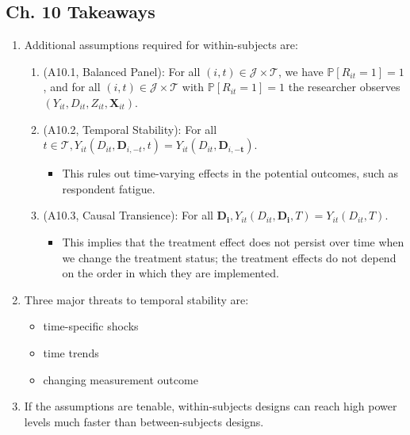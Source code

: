 \documentclass[10pt]{article}
\begin{document}
\subsection{Ch. 10 Takeaways}

\begin{enumerate}
    \item Additional assumptions required for within-subjects are:
        \begin{enumerate}
            \item (A10.1, Balanced Panel): For all $(i, t) \in \mathcal{J} \times \mathcal{T}$, we have $\mathbb{P}\left[R_{i t}=1\right]=1$, and for all $(i, t) \in \mathcal{J} \times \mathcal{T}$ with $\mathbb{P}\left[R_{i t}=1\right]=1$ the researcher observes $\left(Y_{i t}, D_{i t}, Z_{i t}, \boldsymbol{X}_{i t}\right)$.
            \item (A10.2, Temporal Stability): For all $t \in \mathcal{T}, Y_{i t}\left(D_{i t}, \boldsymbol{D}_{i,-t}, t\right)=Y_{i t}\left(D_{i t}, \boldsymbol{D}_{i,-\boldsymbol{t}}\right)$.
                \begin{itemize}
                    \item This rules out time-varying effects in the potential outcomes, 
                        such as respondent fatigue.
                \end{itemize}
            \item (A10.3, Causal Transience): For all $\boldsymbol{D}_{\boldsymbol{i}}, Y_{i t}\left(D_{i t}, \boldsymbol{D}_{\boldsymbol{i}}, T\right)=Y_{i t}\left(D_{i t}, T\right)$.
                \begin{itemize}
                    \item This implies that the treatment effect does not persist over time 
                        when we change the treatment status; the treatment effects 
                        do not depend on the order in which they are implemented.
                \end{itemize}
        \end{enumerate} 
    \item Three major threats to temporal stability are:
        \begin{itemize}
            \item time-specific shocks
            \item time trends
            \item changing measurement outcome
        \end{itemize}
    \item If the assumptions are tenable, within-subjects designs can 
        reach high power levels much faster than between-subjects designs.
\end{enumerate}
\end{document}
